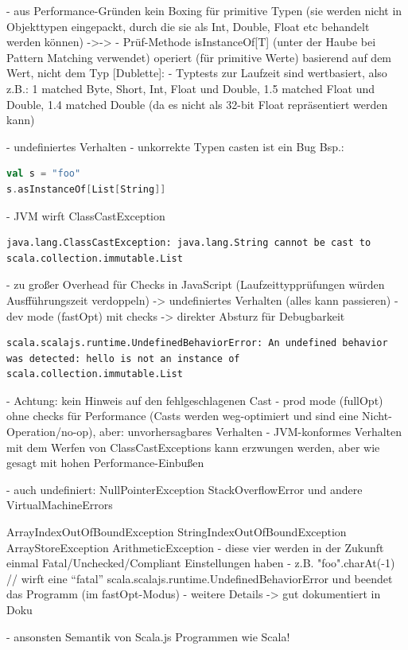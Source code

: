 \documentclass[a4paper, 12pt, hidelinks, listof=totoc, listoftables=totoc, bibliography=totoc]{scrreprt}
\begin{document}
- aus Performance-Gründen kein Boxing für primitive Typen (sie werden nicht in Objekttypen eingepackt, durch die sie als Int, Double, Float etc behandelt werden können) ->->
- Prüf-Methode isInstanceOf[T] (unter der Haube bei Pattern Matching verwendet) operiert (für primitive Werte) basierend auf dem Wert, nicht dem Typ
[Dublette]: - Typtests zur Laufzeit sind wertbasiert, also z.B.: 1 matched Byte, Short, Int, Float und Double, 1.5 matched Float und Double, 1.4 matched Double (da es nicht als 32-bit Float repräsentiert werden kann)


- undefiniertes Verhalten
	- unkorrekte Typen casten ist ein Bug
		Bsp.:
\begin{lstlisting}[language=Scala]
val s = "foo"
s.asInstanceOf[List[String]]
\end{lstlisting}
	- JVM wirft ClassCastException
\begin{lstlisting}
java.lang.ClassCastException: java.lang.String cannot be cast to scala.collection.immutable.List
\end{lstlisting}
	- zu großer Overhead für Checks in JavaScript (Laufzeittypprüfungen würden Ausfführungszeit verdoppeln) -> undefiniertes Verhalten (alles kann passieren)
	- dev mode (fastOpt) mit checks -> direkter Absturz für Debugbarkeit
\begin{lstlisting}
scala.scalajs.runtime.UndefinedBehaviorError: An undefined behavior was detected: hello is not an instance of scala.collection.immutable.List
\end{lstlisting}
		- Achtung: kein Hinweis auf den fehlgeschlagenen Cast
	- prod mode (fullOpt) ohne checks für Performance (Casts werden weg-optimiert und sind eine Nicht-Operation/no-op), aber: unvorhersagbares Verhalten
	- JVM-konformes Verhalten mit dem Werfen von ClassCastExceptions kann erzwungen werden, aber wie gesagt mit hohen Performance-Einbußen
	
	- auch undefiniert:
		NullPointerException
		StackOverflowError und andere VirtualMachineErrors
		
		ArrayIndexOutOfBoundException
		StringIndexOutOfBoundException
		ArrayStoreException
		ArithmeticException
		- diese vier werden in der Zukunft einmal Fatal/Unchecked/Compliant Einstellungen haben
		- z.B. "foo".charAt(-1) //  wirft eine "`fatal"' scala.scalajs.runtime.UndefinedBehaviorError und beendet das Programm (im fastOpt-Modus)
	- weitere Details -> gut dokumentiert in Doku
	
	
	- ansonsten Semantik von Scala.js Programmen wie Scala!
\end{document}
